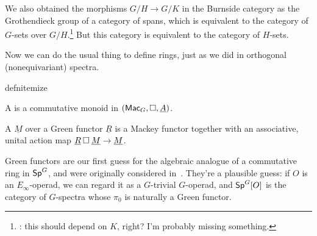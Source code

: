 We also obtained the morphisms $G/H\to G/K$ in the Burnside category as the Grothendieck group of a category of
spans, which is equivalent to the category of $G$-sets over $G/H$.\footnote{\TODO: this should depend on $K$,
right? I'm probably missing something.} But this category is equivalent to the category of $H$-sets.

Now we can do the usual thing to define rings, just as we did in orthogonal (nonequivariant) spectra.
\begin{comp}{defn}{itemize}
	\item A  is a commutative monoid in $(\mathsf{Mac}_G, \mathbin\square, \underline A)$.
	\item A  $\underline M$ over a Green functor $\underline R$ is a Mackey functor together with an
	associative, unital action map $\underline R\mathbin\square\underline M\to\underline M$.
\end{comp}
Green functors are our first guess for the algebraic analogue of a commutative ring in $\mathsf{Sp}^G$, and were
originally considered in~\cite{Green}. They're a plausible guess: if $O$ is an $E_\infty$-operad, we can regard it
as a $G$-trivial $G$-operad, and $\mathsf{Sp}^G[O]$ is the category of $G$-spectra whose $\pi_0$ is naturally a Green
functor.

